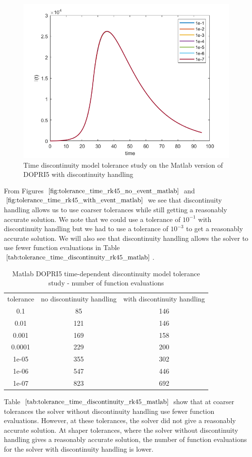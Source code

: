 \begin{figure}[H]
\centering
\includegraphics[width=0.7\linewidth]{./figures/tolerance_time_rk45_with_event_matlab}
\caption{Time discontinuity model tolerance study on the Matlab version of DOPRI5 with discontinuity handling}
\label{fig:tolerance_time_rk45_with_event_matlab}
\end{figure}

From Figures $\ref{fig:tolerance_time_rk45_no_event_matlab}$ and $\ref{fig:tolerance_time_rk45_with_event_matlab}$ we see that discontinuity handling allows us to use coarser tolerances while still getting a reasonably accurate solution. We note that we could use a tolerance of $10^{-1}$ with discontinuity handling but we had to use a tolerance of $10^{-3}$ to get a reasonably accurate solution. We will also see that discontinuity handling allows the solver to use fewer function evaluations in Table $\ref{tab:tolerance_time_discontinuity_rk45_matlab}$.

\begin{table}[H]
\caption {Matlab DOPRI5 time-dependent discontinuity model tolerance study - number of function evaluations} 
\label{tab:tolerance_time_discontinuity_rk45_matlab} 
\begin{center}
\begin{tabular}{ c c c }
tolerance & no discontinuity handling & with discontinuity handling\\ 
0.1 & 85 & 146 \\
0.01 & 121 & 146 \\
0.001 & 169 & 158 \\
0.0001 & 229 & 200 \\
1e-05 & 355 & 302 \\
1e-06 & 547 & 446 \\
1e-07 & 823 & 692 \\
\end{tabular}
\end{center}
\end{table}

Table $\ref{tab:tolerance_time_discontinuity_rk45_matlab}$ show that at coarser tolerances the solver without discontinuity handling use fewer function evaluations. However, at these tolerances, the solver did not give a reasonably accurate solution. At shaper tolerances, where the solver without discontinuity handling gives a reasonably accurate solution, the number of function evaluations for the solver with discontinuity handling is lower.
